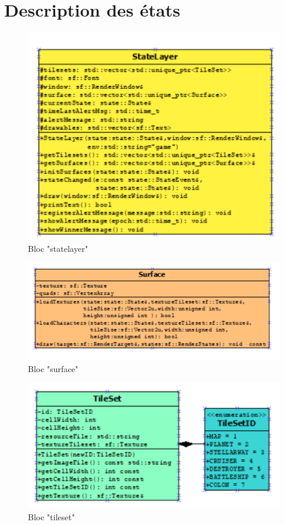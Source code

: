 \section{Description des états}

\begin{figure}[!h]
\centering
\includegraphics[width=1\textwidth]{pics/statelayer.PNG}
\caption[Bloc "statelayer"]{\label{figure_simple}Bloc "statelayer"}
\end{figure}

\begin{figure}[!h]
\centering
\includegraphics[width=1\textwidth]{pics/surface.PNG}
\caption[Bloc "surface"]{\label{figure_simple}Bloc "surface"}
\end{figure}

\begin{figure}[!h]
\centering
\includegraphics[width=1\textwidth]{pics/tileset.PNG}
\caption[Bloc "tileset"]{\label{figure_simple}Bloc "tileset"}
\end{figure}

